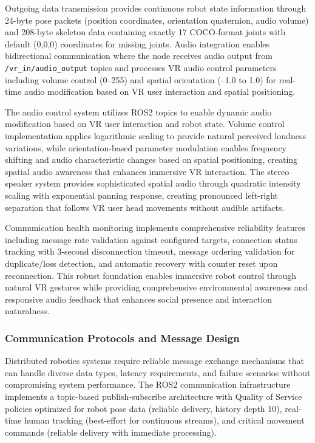 Outgoing data transmission provides continuous robot state information through 24-byte pose packets (position coordinates, orientation quaternion, audio volume) and 208-byte skeleton data containing exactly 17 COCO-format joints with default (0,0,0) coordinates for missing joints. Audio integration enables bidirectional communication where the node receives audio output from \texttt{/vr\_in/audio\_output} topics and processes VR audio control parameters including volume control (0--255) and spatial orientation (--1.0 to 1.0) for real-time audio modification based on VR user interaction and spatial positioning.

The audio control system utilizes ROS2 topics to enable dynamic audio modification based on VR user interaction and robot state. Volume control implementation applies logarithmic scaling to provide natural perceived loudness variations, while orientation-based parameter modulation enables frequency shifting and audio characteristic changes based on spatial positioning, creating spatial audio awareness that enhances immersive VR interaction. The stereo speaker system provides sophisticated spatial audio through quadratic intensity scaling with exponential panning response, creating pronounced left-right separation that follows VR user head movements without audible artifacts.

Communication health monitoring implements comprehensive reliability features including message rate validation against configured targets, connection status tracking with 3-second disconnection timeout, message ordering validation for duplicate/loss detection, and automatic recovery with counter reset upon reconnection. This robust foundation enables immersive robot control through natural VR gestures while providing comprehensive environmental awareness and responsive audio feedback that enhances social presence and interaction naturalness.

\subsubsection{Communication Protocols and Message Design}

Distributed robotics systems require reliable message exchange mechanisms that can handle diverse data types, latency requirements, and failure scenarios without compromising system performance. The ROS2 communication infrastructure implements a topic-based publish-subscribe architecture with Quality of Service policies optimized for robot pose data (reliable delivery, history depth 10), real-time human tracking (best-effort for continuous streams), and critical movement commands (reliable delivery with immediate processing).

